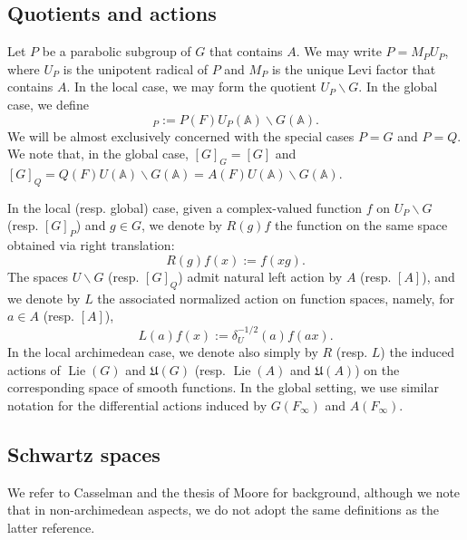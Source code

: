 \documentclass[reqno]{amsart}
\DeclareMathOperator{\Lie}{Lie}
\theoremstyle{plain} \newtheorem{theorem} {Theorem}
\theoremstyle{definition} \newtheorem{definition} [theorem] {Definition}
\theoremstyle{itplain} %
\numberwithin{equation}{section}
\numberwithin{theorem}{section}
\begin{document}
\subsection{Quotients and actions}
Let $P$ be a parabolic subgroup of $G$ that contains $A$.  We may write $P = M_P U_P$, where $U_P$ is the unipotent radical of $P$ and $M_P$ is the unique Levi factor that contains $A$.  In the local case, we may form the quotient $U_P \backslash G$.  In the global case, we define 
\begin{equation*}
[G]_P := P(F) U_P(\mathbb{A}) \backslash G(\mathbb{A}).
\end{equation*}
We will be almost exclusively concerned with the special cases $P = G$ and $P = Q$.  We note that, in the global case, $[G]_G = [G]$ and $[G]_Q = Q(F) U(\mathbb{A}) \backslash G(\mathbb{A}) = A(F) U(\mathbb{A}) \backslash G(\mathbb{A})$.

In the local (resp. global) case, given a complex-valued function $f$ on $U_P \backslash G$ (resp. $[G]_P$) and $g \in G$, we denote by $R(g) f$ the function on the same space obtained via  right translation:
\begin{equation*}
  R(g) f(x) := f(x g).
\end{equation*}
The spaces $U \backslash G$ (resp. $[G]_Q$) admit natural left action by $A$ (resp. $[A]$), and we denote by $L$ the associated normalized action on function spaces, namely, for $a \in A$ (resp. $[A]$), 
\begin{equation}\label{eq:normalized-left-translation}
  L(a) f(x) :=
  \delta_U^{-1/2}(a)
  f(a x).
\end{equation}
In the local archimedean case, we denote also simply by $R$ (resp. $L$) the induced actions of $\Lie(G)$ and $\mathfrak{U}(G)$ (resp. $\Lie(A)$ and $\mathfrak{U}(A)$) on the corresponding space of smooth functions.  In the global setting, we use similar notation for the differential actions induced by $G(F_\infty)$ and $A(F_\infty)$.



\subsection{Schwartz spaces}\label{sec:schwartz-spaces}
We refer to Casselman \cite{MR1001613} and the thesis of Moore \cite{MooreOSU2018} for background, although we note that in non-archimedean aspects, we do not adopt the same definitions as the latter reference.
\end{document}
